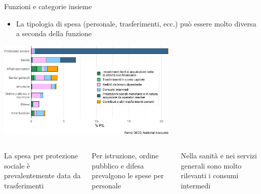 \documentclass[aspectratio=149,11pt,italian]{beamer}
\begin{document}
\begin{frame}{Funzioni e categorie insieme}
\begin{itemize}
\item La tipologia di spesa (personale, trasferimenti, ecc.) può essere molto diversa a seconda della funzione
\end{itemize}

\begin{center}
\includegraphics[height=4.6cm]{./figure/spesa-primaria-funzioni-categorie-ITA-color.pdf}
\end{center}

\begin{columns}
\begin{column}{.33\columnwidth}
\begin{block}{}
\footnotesize
La spesa per protezione sociale è prevalentemente data da trasferimenti
\end{block}
\end{column}

\begin{column}{.33\columnwidth}
\begin{block}{}
\footnotesize
Per istruzione, ordine pubblico e difesa prevalgono le spese per personale
\end{block}
\end{column}

\begin{column}{.33\columnwidth}
\begin{block}{}
\footnotesize
Nella sanità e nei servizi generali sono molto rilevanti i consumi intermedi
\end{block}
\end{column}
\end{columns}
\end{frame}
\end{document}
